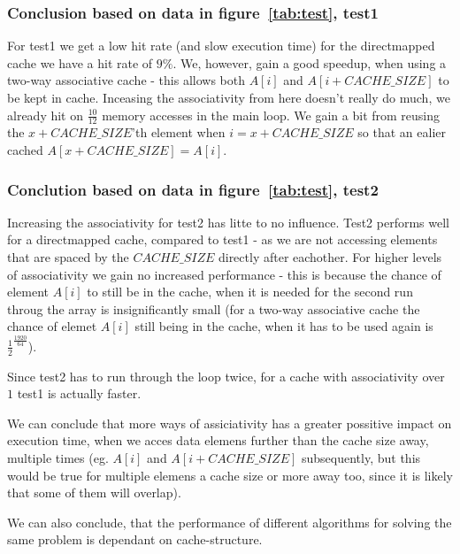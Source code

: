 \subsubsection{Conclusion based on data in figure~\ref{tab:test}, test1}
For test1 we get a low hit rate (and slow execution time) for the directmapped
cache we have a hit rate of $9\%$. We, however, gain a good speedup, when using
a two-way associative cache - this allows both $A[i]$ and $A[i + CACHE\_SIZE]$
to be kept in cache. Inceasing the associativity from here doesn't really do
much, we already hit on $\frac{10}{12}$ memory accesses in the main loop. We
gain a bit from reusing the $x + CACHE\_SIZE$'th element when $i = x + CACHE\_SIZE$ so that an
ealier cached $A[x + CACHE\_SIZE] = A[i]$.

\subsubsection{Conclution based on data in figure~\ref{tab:test}, test2}
Increasing the associativity for test2 has litte to no influence. Test2 performs
well for a directmapped cache, compared to test1 - as we are not accessing
elements that are spaced by the $CACHE\_SIZE$ directly after eachother. For
higher levels of associativity we gain no increased performance - this is
because the chance of element $A[i]$ to still be in the cache, when it is needed
for the second run throug the array is insignificantly small (for a two-way
associative cache the chance of elemet $A[i]$ still being in the cache, when
it has to be used again is $\frac{1}{2}^\frac{1920}{64}$).

Since test2 has to run through the loop twice, for a cache with associativity
over $1$ test1 is actually faster.

We can conclude that more ways of assiciativity has a greater possitive impact
on execution time, when we acces data elemens further than the cache size
away, multiple times (eg. $A[i]$ and $A[i + CACHE\_SIZE]$ subsequently, but
this would be true for multiple elemens a cache size or more away too, since it
is likely that some of them will overlap).

We can also conclude, that the performance of different algorithms for solving
the same problem is dependant on cache-structure.
